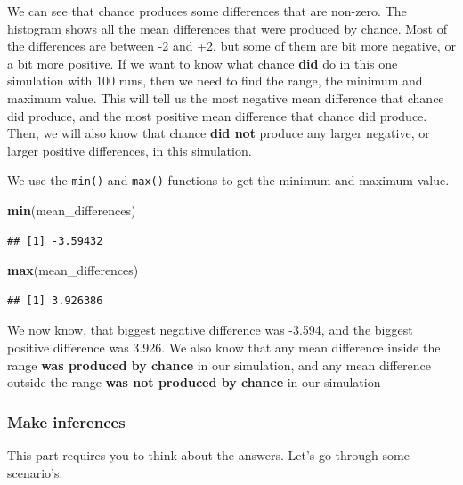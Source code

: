 \documentclass[]{book}
\newenvironment{Shaded}{\begin{snugshade}}{\end{snugshade}}
\newcommand{\KeywordTok}[1]{\textcolor[rgb]{0.13,0.29,0.53}{\textbf{{#1}}}}
\newcommand{\NormalTok}[1]{{#1}}
\theoremstyle{definition}
\theoremstyle{definition}
\theoremstyle{definition}
\theoremstyle{remark}
\begin{document}
We can see that chance produces some differences that are non-zero. The
histogram shows all the mean differences that were produced by chance.
Most of the differences are between -2 and +2, but some of them are bit
more negative, or a bit more positive. If we want to know what chance
\textbf{did} do in this one simulation with 100 runs, then we need to
find the range, the minimum and maximum value. This will tell us the
most negative mean difference that chance did produce, and the most
positive mean difference that chance did produce. Then, we will also
know that chance \textbf{did not} produce any larger negative, or larger
positive differences, in this simulation.

We use the \texttt{min()} and \texttt{max()} functions to get the
minimum and maximum value.

\begin{Shaded}
\begin{Highlighting}[]
\KeywordTok{min}\NormalTok{(mean_differences)}
\end{Highlighting}
\end{Shaded}

\begin{verbatim}
## [1] -3.59432
\end{verbatim}

\begin{Shaded}
\begin{Highlighting}[]
\KeywordTok{max}\NormalTok{(mean_differences)}
\end{Highlighting}
\end{Shaded}

\begin{verbatim}
## [1] 3.926386
\end{verbatim}

We now know, that biggest negative difference was -3.594, and the
biggest positive difference was 3.926. We also know that any mean
difference inside the range \textbf{was produced by chance} in our
simulation, and any mean difference outside the range \textbf{was not
produced by chance} in our simulation

\subsubsection{Make inferences}\label{make-inferences}

This part requires you to think about the answers. Let's go through some
scenario's.
\end{document}
